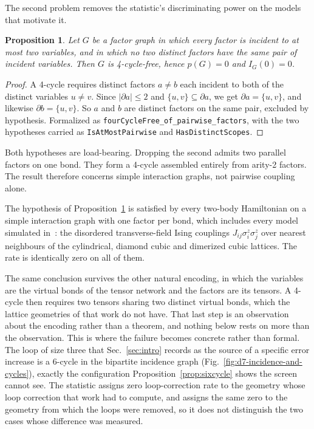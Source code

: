 \documentclass[aps,prx,reprint,nofootinbib,floatfix]{revtex4-2}
\newtheorem{prop}[thm]{Proposition}
\begin{document}
The second problem removes the statistic's discriminating power on the models
that motivate it.

\begin{prop}
\label{prop:pairwise}
Let $G$ be a factor graph in which every factor is incident to at most two
variables, and in which no two distinct factors have the same pair of incident
variables. Then $G$ is 4-cycle-free, hence $p(G) = 0$ and $I_G(0) = 0$.
\end{prop}

\begin{proof}
A 4-cycle requires distinct factors $a \neq b$ each incident to both of the
distinct variables $u \neq v$. Since $|\partial a| \leq 2$ and
$\{u,v\} \subseteq \partial a$, we get $\partial a = \{u,v\}$, and likewise
$\partial b = \{u,v\}$. So $a$ and $b$ are distinct factors on the same pair,
excluded by hypothesis. Formalized as
\texttt{fourCycleFree\_of\_pairwise\_factors}, with the two hypotheses carried as
\texttt{IsAtMostPairwise} and \texttt{HasDistinctScopes}.
\end{proof}

Both hypotheses are load-bearing. Dropping the second admits two parallel factors
on one bond. They form a 4-cycle assembled entirely from arity-2 factors. The
result therefore concerns simple interaction graphs, not pairwise coupling alone.

The hypothesis of Proposition~\ref{prop:pairwise} is satisfied by every
two-body Hamiltonian on a simple interaction graph with one factor per bond,
which includes every model simulated
in~\cite{TindallMelloFishmanStoudenmireSels2026Science392}: the disordered
transverse-field Ising couplings $J_{ij}\sigma^z_i\sigma^z_j$ over nearest
neighbours of the cylindrical, diamond cubic and dimerized cubic lattices. The
rate is identically zero on all of them.

The same conclusion survives the other natural encoding, in which the variables
are the virtual bonds of the tensor network and the factors are its tensors. A
4-cycle then requires two tensors sharing two distinct virtual bonds, which the
lattice geometries of that work do not have. That last step is an observation
about the encoding rather than a theorem, and nothing below rests on more than
the observation. This is where the failure becomes concrete rather than formal.
The loop of size three that Sec.~\ref{sec:intro} records as the source of a
specific error increase is a 6-cycle in the bipartite incidence graph
(Fig.~\ref{fig:d7-incidence-and-cycles}), exactly the configuration
Proposition~\ref{prop:sixcycle} shows the screen cannot see. The statistic
assigns zero loop-correction rate to the geometry whose loop correction that
work had to compute, and assigns the same zero to the geometry from which the
loops were removed, so it does not distinguish the two cases whose difference
was measured.
\end{document}
